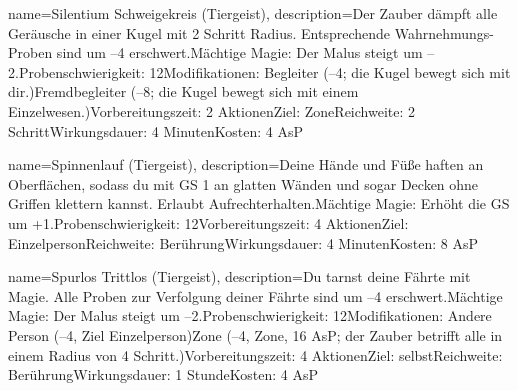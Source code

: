 {
    name={Silentium Schweigekreis (Tiergeist)},
    description={Der Zauber dämpft alle Geräusche in einer Kugel mit 2 Schritt Radius. Entsprechende Wahrnehmungs-Proben sind um –4 erschwert.\newline Mächtige Magie: Der Malus steigt um –2.\newline Probenschwierigkeit: 12\newline Modifikationen: Begleiter (–4; die Kugel bewegt sich mit dir.)\newline Fremdbegleiter (–8; die Kugel bewegt sich mit einem Einzelwesen.)\newline Vorbereitungszeit: 2 Aktionen\newline Ziel: Zone\newline Reichweite: 2 Schritt\newline Wirkungsdauer: 4 Minuten\newline Kosten: 4 AsP}
}


{
    name={Spinnenlauf (Tiergeist)},
    description={Deine Hände und Füße haften an Oberflächen, sodass du mit GS 1 an glatten Wänden und sogar Decken ohne Griffen klettern kannst. Erlaubt Aufrechterhalten.\newline Mächtige Magie: Erhöht die GS um +1.\newline Probenschwierigkeit: 12\newline Vorbereitungszeit: 4 Aktionen\newline Ziel: Einzelperson\newline Reichweite: Berührung\newline Wirkungsdauer: 4 Minuten\newline Kosten: 8 AsP}
}


{
    name={Spurlos Trittlos (Tiergeist)},
    description={Du tarnst deine Fährte mit Magie. Alle Proben zur Verfolgung deiner Fährte sind um –4 erschwert.\newline Mächtige Magie: Der Malus steigt um –2.\newline Probenschwierigkeit: 12\newline Modifikationen: Andere Person (–4, Ziel Einzelperson)\newline Zone (–4, Zone, 16 AsP; der Zauber betrifft alle in einem Radius von 4 Schritt.)\newline Vorbereitungszeit: 4 Aktionen\newline Ziel: selbst\newline Reichweite: Berührung\newline Wirkungsdauer: 1 Stunde\newline Kosten: 4 AsP}
}



